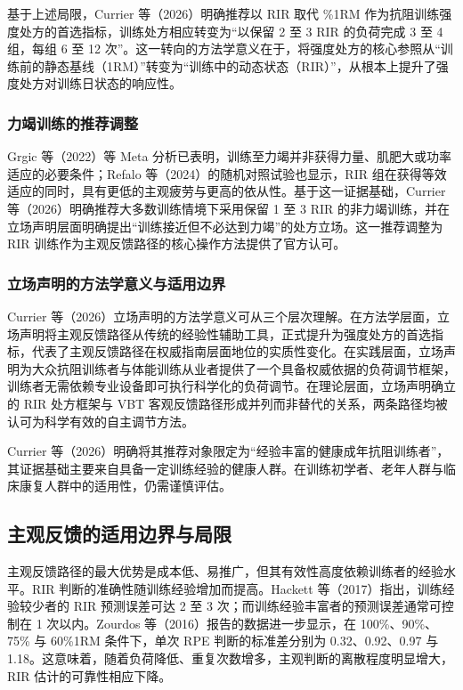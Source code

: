 \documentclass[UTF8,zihao=-4,twoside,openany]{ctexbook}
\begin{document}
基于上述局限，Currier 等（2026）明确推荐以 RIR 取代 \%1RM 作为抗阻训练强度处方的首选指标，训练处方相应转变为“以保留 2 至 3 RIR 的负荷完成 3 至 4 组，每组 6 至 12 次”。这一转向的方法学意义在于，将强度处方的核心参照从“训练前的静态基线（1RM）”转变为“训练中的动态状态（RIR）”，从根本上提升了强度处方对训练日状态的响应性。

\subsubsection{力竭训练的推荐调整}
Grgic 等（2022）等 Meta 分析已表明，训练至力竭并非获得力量、肌肥大或功率适应的必要条件；Refalo 等（2024）的随机对照试验也显示，RIR 组在获得等效适应的同时，具有更低的主观疲劳与更高的依从性。基于这一证据基础，Currier 等（2026）明确推荐大多数训练情境下采用保留 1 至 3 RIR 的非力竭训练，并在立场声明层面明确提出“训练接近但不必达到力竭”的处方立场。这一推荐调整为 RIR 训练作为主观反馈路径的核心操作方法提供了官方认可。

\subsubsection{立场声明的方法学意义与适用边界}
Currier 等（2026）立场声明的方法学意义可从三个层次理解。在方法学层面，立场声明将主观反馈路径从传统的经验性辅助工具，正式提升为强度处方的首选指标，代表了主观反馈路径在权威指南层面地位的实质性变化。在实践层面，立场声明为大众抗阻训练者与体能训练从业者提供了一个具备权威依据的负荷调节框架，训练者无需依赖专业设备即可执行科学化的负荷调节。在理论层面，立场声明确立的 RIR 处方框架与 VBT 客观反馈路径形成并列而非替代的关系，两条路径均被认可为科学有效的自主调节方法。

Currier 等（2026）明确将其推荐对象限定为“经验丰富的健康成年抗阻训练者”，其证据基础主要来自具备一定训练经验的健康人群。在训练初学者、老年人群与临床康复人群中的适用性，仍需谨慎评估。

\subsection{主观反馈的适用边界与局限}
主观反馈路径的最大优势是成本低、易推广，但其有效性高度依赖训练者的经验水平。RIR 判断的准确性随训练经验增加而提高。Hackett 等（2017）指出，训练经验较少者的 RIR 预测误差可达 2 至 3 次；而训练经验丰富者的预测误差通常可控制在 1 次以内。Zourdos 等（2016）报告的数据进一步显示，在 100\%、90\%、75\% 与 60\%1RM 条件下，单次 RPE 判断的标准差分别为 0.32、0.92、0.97 与 1.18。这意味着，随着负荷降低、重复次数增多，主观判断的离散程度明显增大，RIR 估计的可靠性相应下降。
\end{document}
